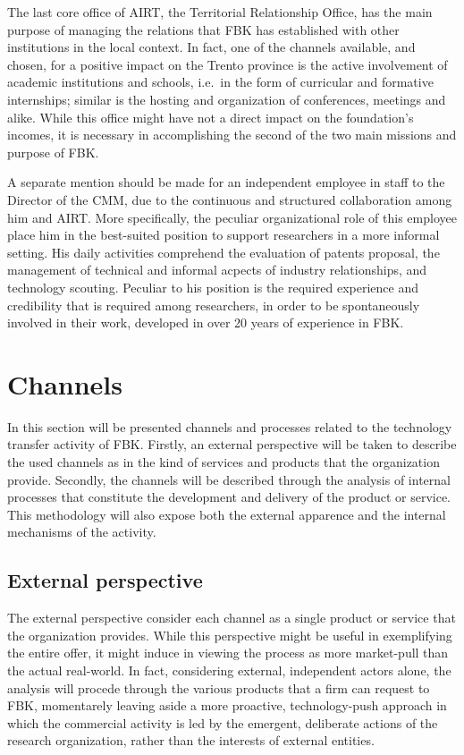 The last core office of AIRT, the Territorial Relationship Office, has the main purpose of managing the relations that FBK has established with other institutions in the local context. In fact, one of the channels available, and chosen, for a positive impact on the Trento province is the active involvement of academic institutions and schools, i.e.\ in the form of curricular and formative internships; similar is the hosting and organization of conferences, meetings and alike. While this office might have not a direct impact on the foundation's incomes, it is necessary in accomplishing the second of the two main missions and purpose of FBK.

A separate mention should be made for an independent employee in staff to the Director of the CMM, due to the continuous and structured collaboration among him and AIRT. More specifically, the peculiar organizational role of this employee place him in the best-suited position to support researchers in a more informal setting. His daily activities comprehend the evaluation of patents proposal, the management of technical and informal acpects of industry relationships, and technology scouting. Peculiar to his position is the required experience and credibility that is required among researchers, in order to be spontaneously involved in their work, developed in over 20 years of experience in FBK.

\section{Channels}

In this section will be presented channels and processes related to the technology transfer activity of FBK. Firstly, an external perspective will be taken to describe the used channels as in the kind of services and products that the organization provide. Secondly, the channels will be described through the analysis of internal processes that constitute the development and delivery of the product or service. This methodology will also expose both the external apparence and the internal mechanisms of the activity. 

\subsection{External perspective}

The external perspective consider each channel as a single product or service that the organization provides. While this perspective might be useful in exemplifying the entire offer, it might induce in viewing the process as more market-pull than the actual real-world. In fact, considering external, independent actors alone, the analysis will procede through the various products that a firm can request to FBK, momentarely leaving aside a more proactive, technology-push approach in which the commercial activity is led by the emergent, deliberate actions of the research organization, rather than the interests of external entities.

